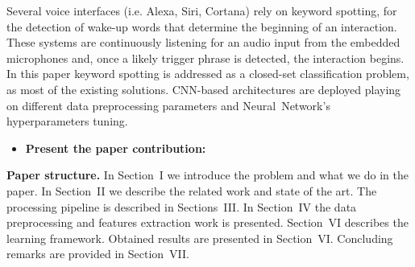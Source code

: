 \noindent  Several voice interfaces (i.e. Alexa, Siri, Cortana) rely on keyword spotting, for the detection of wake-up words that determine the beginning of an interaction. These systems are continuously listening for an audio input from the embedded microphones and, once a likely trigger phrase is detected, the interaction begins. 
In this paper keyword spotting is addressed as a closed-set classification problem, as most of the existing solutions. CNN-based architectures are deployed playing on different data preprocessing parameters and \mbox{Neural Network's} hyperparameters tuning. 
\begin{itemize} 
\item \textbf{Present the paper contribution:} 
\end{itemize}
\noindent \textbf{Paper structure.} In Section~I we introduce the problem and what we do in the paper. In Section~II we describe the related work and state of the art. The processing pipeline is described in Sections~III. In Section~IV the data preprocessing and features extraction work is presented. Section~VI describes the learning framework. Obtained results are presented in Section~VI.  Concluding remarks are provided in Section~VII.

